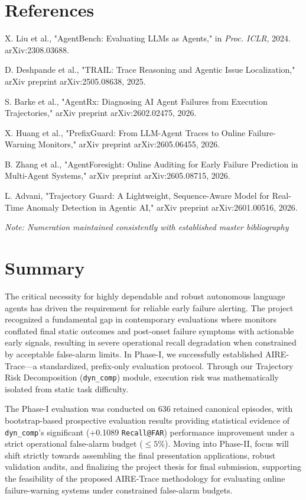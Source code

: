 \documentclass[12pt,a4paper]{article}
\begin{document}
\newpage


\newpage

\section{References}

\noindent [1] X. Liu et al., "AgentBench: Evaluating LLMs as Agents," in \textit{Proc. ICLR}, 2024. arXiv:2308.03688.\par
\noindent [6] D. Deshpande et al., "TRAIL: Trace Reasoning and Agentic Issue Localization," arXiv preprint arXiv:2505.08638, 2025.\par
\noindent [7] S. Barke et al., "AgentRx: Diagnosing AI Agent Failures from Execution Trajectories," arXiv preprint arXiv:2602.02475, 2026.\par
\noindent [10] X. Huang et al., "PrefixGuard: From LLM-Agent Traces to Online Failure-Warning Monitors," arXiv preprint arXiv:2605.06455, 2026.\par
\noindent [11] B. Zhang et al., "AgentForesight: Online Auditing for Early Failure Prediction in Multi-Agent Systems," arXiv preprint arXiv:2605.08715, 2026.\par
\noindent [12] L. Advani, "Trajectory Guard: A Lightweight, Sequence-Aware Model for Real-Time Anomaly Detection in Agentic AI," arXiv preprint arXiv:2601.00516, 2026.\par

\vspace{1em}
\noindent\textit{Note: Numeration maintained consistently with established master bibliography}

\newpage


\newpage

\section{Summary}
The critical necessity for highly dependable and robust autonomous language agents has driven the requirement for reliable early failure alerting. The project recognized a fundamental gap in contemporary evaluations where monitors conflated final static outcomes and post-onset failure symptoms with actionable early signals, resulting in severe operational recall degradation when constrained by acceptable false-alarm limits. In Phase-I, we successfully established AIRE-Trace---a standardized, prefix-only evaluation protocol. Through our Trajectory Risk Decomposition (\texttt{dyn\_comp}) module, execution risk was mathematically isolated from static task difficulty. 

The Phase-I evaluation was conducted on 636 retained canonical episodes, with bootstrap-based prospective evaluation results providing statistical evidence of \texttt{dyn\_comp}'s significant (+0.1089 \texttt{Recall@FAR}) performance improvement under a strict operational false-alarm budget ($\le 5\%$). Moving into Phase-II, focus will shift strictly towards assembling the final presentation applications, robust validation audits, and finalizing the project thesis for final submission, supporting the feasibility of the proposed AIRE-Trace methodology for evaluating online failure-warning systems under constrained false-alarm budgets.
\end{document}

